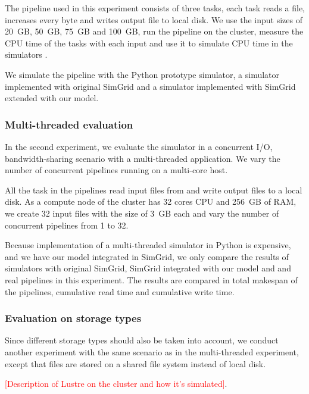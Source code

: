 \documentclass[conference]{IEEEtran}
\begin{document}
			The pipeline used in this experiment consists of three tasks, 
			each task reads a file, increases every byte and writes output file 
			to local disk. 
			We use the input sizes of 20~GB, 50~GB, 75~GB and 100~GB, run 
			the pipeline on the cluster, measure the CPU time of the tasks  
			with each input and use it to simulate CPU time in the simulators .

			We simulate the pipeline with the Python prototype simulator, 
			a simulator implemented with original SimGrid and a simulator implemented 
			with SimGrid extended with our model.  
			
			\subsubsection{Multi-threaded evaluation}

			In the second experiment, we evaluate the simulator in a concurrent I/O, 
			bandwidth-sharing scenario with a multi-threaded application. 			
			We vary the number of concurrent pipelines running on a multi-core host.  
			
			All the task in the pipelines read input files from and write output files 
			to a local disk. 
			As a compute node of the cluster has 32 cores CPU and 256~GB of RAM,  
			we create 32 input files with the size of 3~GB each and vary the number of 
			concurrent pipelines from 1 to 32. 
			
			Because implementation of a multi-threaded simulator  in Python is 
			expensive, and we have our model integrated in SimGrid, 
			we only compare the results of simulators with original SimGrid, 
			SimGrid integrated with our model and and real pipelines in this 
			experiment. The results are compared in total makespan of the pipelines, 
			cumulative read time and cumulative write time.
			
			\subsubsection{Evaluation on storage types}
			
		    Since different storage types should also be taken into account, 
		    we conduct another experiment with the same scenario as 
		    in the multi-threaded experiment, except that files are stored on a 
		    shared file system instead of local disk. 
		    
		    \textcolor{red}{[Description of Lustre on the cluster and how it's 
		    simulated]}. 
		    
\end{document}
